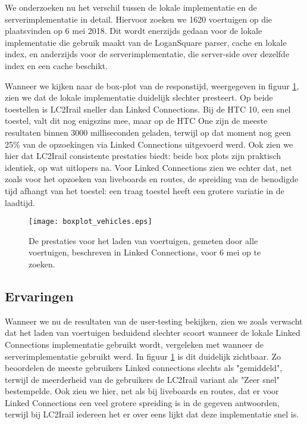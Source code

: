 We onderzoeken nu het verschil tussen de lokale implementatie en de serverimplementatie in detail. Hiervoor zoeken we 1620 voertuigen op die plaatsvinden op 6 mei 2018. Dit wordt enerzijds gedaan voor de lokale implementatie die gebruik maakt van de LoganSquare parser, cache en lokale index, en anderzijds voor de serverimplementatie, die server-side over dezelfde index en een cache beschikt.

Wanneer we kijken naar de box-plot van de responstijd, weergegeven in figuur \ref{fig:vehicleboxplot}, zien we dat de lokale implementatie duidelijk slechter presteert. Op beide toestellen is LC2Irail sneller dan Linked Connections. Bij de HTC 10, een snel toestel, valt dit nog enigszins mee, maar op de HTC One zijn de meeste resultaten binnen 3000 milliseconden geladen, terwijl op dat moment nog geen 25\% van de opzoekingen via Linked Connections uitgevoerd werd. Ook zien we hier dat LC2Irail consistente prestaties biedt: beide box plots zijn praktisch identiek, op wat uitlopers na. Voor Linked Connections zien we echter dat, net zoals voor het opzoeken van liveboards en routes, de spreiding van de benodigde tijd afhangt van het toestel: een traag toestel heeft een grotere variatie in de laadtijd.

\begin{figure}[h]
	\centering
	\texttt{[image: boxplot\_vehicles.eps]}
	\caption[Prestaties voor het laden van voertuigen]{De prestaties voor het laden van voertuigen, gemeten door alle voertuigen, beschreven in Linked Connections, voor 6 mei op te zoeken.}
	\label{fig:vehicleboxplot}
\end{figure}


\subsection{Ervaringen}
Wanneer we nu de resultaten van de user-testing bekijken, zien we zoals verwacht dat het laden van voertuigen beduidend slechter scoort wanneer de lokale Linked Connections implementatie gebruikt wordt, vergeleken met wanneer de serverimplementatie gebruikt werd. In figuur \ref{fig:vehicleboxplot} is dit duidelijk zichtbaar. Zo beoordelen de meeste gebruikers Linked connections slechts als "gemiddeld", terwijl de meerderheid van de gebruikers de LC2Irail variant als "Zeer snel" bestempelde. Ook zien we hier, net als bij liveboards en routes, dat er voor Linked Connections een veel grotere spreiding is in de gegeven antwoorden, terwijl  bij LC2Irail iedereen het er over eens lijkt dat deze implementatie snel is.

